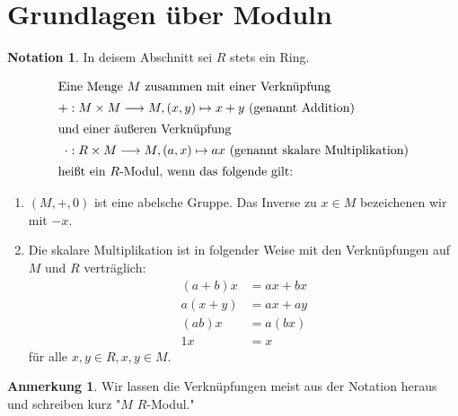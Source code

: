 \documentclass[a4paper, titlepage]{article}
\theoremstyle{definition}
\newtheorem*{anm}{Anmerkung}
\newtheorem*{notation}{Notation}
\begin{document}
        \section{Grundlagen über Moduln}
        \begin{notation}
            In deisem Abschnitt sei $R$ stets ein Ring.
        \end{notation}
        \begin{definition}
            \begin{align*}
            \intertext{Eine Menge $M$ zusammen mit einer Verknüpfung}
            +&: M\times M \longrightarrow M, (x,y)\mapsto x+y \text{ (genannt Addition)}\\
            \intertext{und einer äußeren Verknüpfung}
            \cdot&: R\times M \longrightarrow M ,(a,x)\mapsto ax \text{ (genannt skalare Multiplikation)}\\
            \intertext{heißt ein $R$-Modul, wenn das folgende gilt:}
            \end{align*}
            \begin{enumerate}[(M1)]
                \item $(M,+,0)$ ist eine abelsche Gruppe. Das Inverse zu $x\in M$ bezeichenen wir mit $-x.$ 
                \item Die skalare Multiplikation ist in folgender Weise mit den Verknüpfungen auf $M$ und $R$ verträglich:
                \begin{align*}
                    (a+b)x&=ax+bx\\
                    a(x+y)&=ax+ay\\
                    (ab)x&=a(bx)\\
                    1x&=x
                \end{align*}
                für alle $x,y\in R, x,y\in M.$
            \end{enumerate}
        \end{definition}
        \begin{anm}
            Wir lassen die Verknüpfungen meist aus der Notation heraus und schreiben kurz "$M$ $R$-Modul."
        \end{anm}
\end{document}
